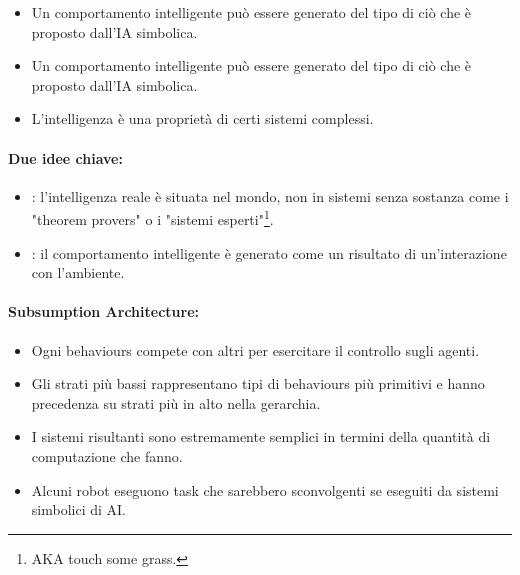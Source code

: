 \begin{itemize}
  \item Un comportamento intelligente può essere generato  del tipo di ciò che è proposto dall'IA simbolica. 
  \item  Un comportamento intelligente può essere generato  del tipo di ciò che è proposto dall'IA simbolica. 
  \item L'intelligenza è una proprietà  di certi sistemi complessi.
\end{itemize}

\paragraph{Due idee chiave:}

\begin{itemize}
  \item {}: l'intelligenza reale è situata nel mondo, non in sistemi senza sostanza come i "theorem provers" o i "sistemi esperti"\footnote{AKA touch some grass.}. 
  \item {}: il comportamento intelligente è generato come un risultato di un'interazione con l'ambiente.
\end{itemize}



\paragraph{Subsumption Architecture:}
\begin{itemize}
  \item Ogni behaviours compete con altri per esercitare il controllo sugli agenti. 
  \item Gli strati più bassi rappresentano tipi di behaviours più primitivi e hanno precedenza su strati più in alto nella gerarchia. 
  \item I sistemi risultanti sono estremamente semplici in termini della quantità di computazione che fanno. 
  \item Alcuni robot eseguono task che sarebbero sconvolgenti se eseguiti da sistemi simbolici di AI.
\end{itemize}


